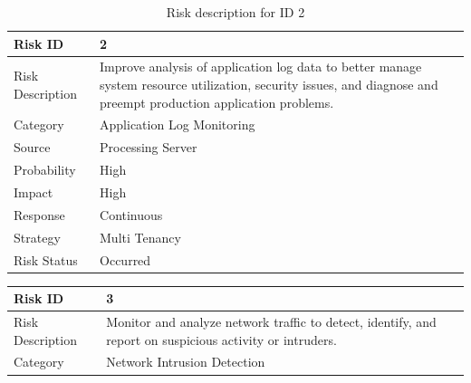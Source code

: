 \documentclass[oneside,a4paper,12pt]{book}
\begin{document}
\begin{center}
\begin{table}[H]
\centering
\begin{tabular}{p{1.09in}p{4.07in}}
\hline
\hline
\multicolumn{1}{p{1.09in}}{Risk ID} & 
\multicolumn{1}{p{4.07in}}{2} \\
\hline
\hline
\multicolumn{1}{p{1.09in}}{Risk Description} & 
\multicolumn{1}{p{4.07in}}{Improve analysis of application log data to better manage system resource utilization, security issues, and diagnose and preempt production application problems. \par } \\
\hline
\multicolumn{1}{p{1.09in}}{Category} & 
\multicolumn{1}{p{4.07in}}{Application Log Monitoring} \\
\hline
\multicolumn{1}{p{1.09in}}{Source} & 
\multicolumn{1}{p{4.07in}}{Processing Server} \\
\hline
\multicolumn{1}{p{1.09in}}{Probability} & 
\multicolumn{1}{p{4.07in}}{High} \\
\hline
\multicolumn{1}{p{1.09in}}{Impact} & 
\multicolumn{1}{p{4.07in}}{High} \\
\hline
\multicolumn{1}{p{1.09in}}{Response} & 
\multicolumn{1}{p{4.07in}}{Continuous} \\
\hline
\multicolumn{1}{p{1.09in}}{Strategy} & 
\multicolumn{1}{p{4.07in}}{Multi Tenancy} \\
\hline
\multicolumn{1}{p{1.09in}}{Risk Status} & 
\multicolumn{1}{p{4.07in}}{Occurred} \\
\hline
\hline
\end{tabular}
\caption{Risk description for ID 2}
\end{table}
\begin{table}[H]
\centering
\begin{tabular}{p{1.09in}p{4.07in}}
\hline
\hline
\multicolumn{1}{p{1.09in}}{Risk ID} & 
\multicolumn{1}{p{4.07in}}{3} \\
\hline
\hline
\multicolumn{1}{p{1.09in}}{Risk Description} & 
\multicolumn{1}{p{4.07in}}{Monitor and analyze network traffic to detect, identify, and report on suspicious activity or intruders. \par } \\
\hline
\multicolumn{1}{p{1.09in}}{Category} & 
\multicolumn{1}{p{4.07in}}{Network Intrusion Detection} \\

\end{tabular}
\end{table}
\end{center}
\end{document}
